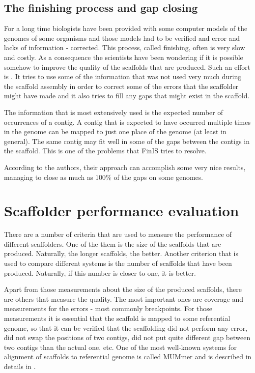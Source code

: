 \documentclass[11pt]{article}
\begin{document}
\subsection{The finishing process and gap closing} %
\label{sub:The finishing process and gap closing}
For a long time biologists have been provided with some computer models of the
genomes of some organisms and those models had to be verified and error and lacks
of information - corrected. This process, called finishing, often is very slow
and costly. As a consequence the scientists have been wondering if it is
possible somehow to improve the quality of the scaffolds that are produced. Such
an effort is \cite{finIs}. It tries to use some of the information that was not
used very much during the scaffold assembly in order to correct some of the
errors that the scaffolder might have made and it also tries to fill any gaps
that might exist in the scaffold.

The information that is most extensively used is the expected number of
occurrences of a contig. A contig that is expected to have occurred multiple
times in the genome can be mapped to just one place of the genome (at least in
general). The same contig may fit well in some of the gaps between the contigs
in the scaffold. This is one of the problems that FinIS tries to resolve.

According to the authors, their approach can accomplish some very nice results,
managing to close as much as 100\% of the gaps on some genomes.


\section{Scaffolder performance evaluation} %
\label{sec:Scaffolder performance evaluation}
There are a number of criteria that are used to measure the performance of
different scaffolders. One of the them is the size of the scaffolds that are
produced. Naturally, the longer scaffolds, the better. Another criterion that is
used to compare different systems is the number of scaffolds that have been
produced. Naturally, if this number is closer to one, it is better.

Apart from those measurements about the size of the produced scaffolds, there
are others that measure the quality. The most important ones are coverage and
measurements for the errors - most commonly breakpoints. For those measurements
it is essential that the scaffold is mapped to some referential genome, so that
it can be verified that the scaffolding did not perform any error, did not swap
the positions of two contigs, did not put quite different gap between two
contigs than the actual one, etc. One of the most well-known systems for
alignment of scaffolds to referential genome is called MUMmer and is described
in details in \cite{MUMmer}.
\end{document}
